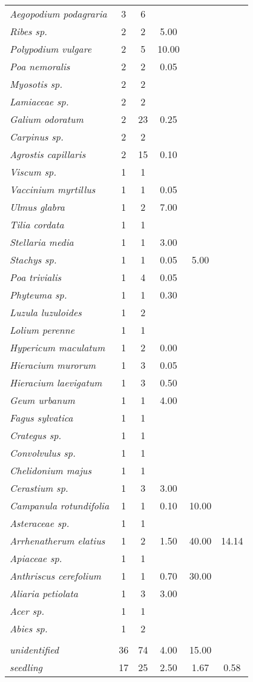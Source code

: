 \documentclass[a4paper]{article}
\newcommand{\dashrule}[1][black]{%
	\color{#1}\rule[\dimexpr.5ex-.2pt]{4pt}{.4pt}\xleaders\hbox{\rule{4pt}{0pt}\rule[\dimexpr.5ex-.2pt]{4pt}{.4pt}}\hfill\kern0pt%
}
\begin{document}
\begin{longtable}[H]{@{} >{\itshape}lccccc @{}}
		 Aegopodium podagraria & 3 & 6 &  &  &  \\ 
		 Ribes sp. & 2 & 2 & 5.00 &  &  \\ 
		 Polypodium vulgare & 2 & 5 & 10.00 &  &  \\ 
		 Poa nemoralis & 2 & 2 & 0.05 &  &  \\ 
		 Myosotis sp. & 2 & 2 &  &  &  \\ 
		 Lamiaceae sp. & 2 & 2 &  &  &  \\ 
		 Galium odoratum & 2 & 23 & 0.25 &  &  \\ 
		 Carpinus sp. & 2 & 2 &  &  &  \\ 
		 Agrostis capillaris & 2 & 15 & 0.10 &  &  \\ 
		 Viscum sp. & 1 & 1 &  &  &  \\ 
		 Vaccinium myrtillus & 1 & 1 & 0.05 &  &  \\ 
		 Ulmus glabra & 1 & 2 & 7.00 &  &  \\ 
		 Tilia cordata & 1 & 1 &  &  &  \\ 
		 Stellaria media & 1 & 1 & 3.00 &  &  \\ 
		 Stachys sp. & 1 & 1 & 0.05 & 5.00 &  \\ 
		 Poa trivialis & 1 & 4 & 0.05 &  &  \\ 
		 Phyteuma sp. & 1 & 1 & 0.30 &  &  \\ 
		 Luzula luzuloides & 1 & 2 &  &  &  \\ 
		 Lolium perenne & 1 & 1 &  &  &  \\ 
		 Hypericum maculatum & 1 & 2 & 0.00 &  &  \\ 
		 Hieracium murorum & 1 & 3 & 0.05 &  &  \\ 
		 Hieracium laevigatum & 1 & 3 & 0.50 &  &  \\ 
		 Geum urbanum & 1 & 1 & 4.00 &  &  \\ 
		 Fagus sylvatica & 1 & 1 &  &  &  \\ 
		 Crategus sp. & 1 & 1 &  &  &  \\ 
		 Convolvulus sp. & 1 & 1 &  &  &  \\ 
		 Chelidonium majus & 1 & 1 &  &  &  \\ 
		 Cerastium sp. & 1 & 3 & 3.00 &  &  \\ 
		 Campanula rotundifolia & 1 & 1 & 0.10 & 10.00 &  \\ 
		 Asteraceae sp. & 1 & 1 &  &  &  \\ 
		 Arrhenatherum elatius & 1 & 2 & 1.50 & 40.00 & 14.14 \\ 
		 Apiaceae sp. & 1 & 1 &  &  &  \\ 
		 Anthriscus cerefolium & 1 & 1 & 0.70 & 30.00 &  \\ 
		 Aliaria petiolata & 1 & 3 & 3.00 &  &  \\ 
		 Acer sp. & 1 & 1 &  &  &  \\ 
		 Abies sp. & 1 & 2 &  &  &  \\ 
		 \multicolumn{6}{@{}c@{}}{\makebox[\linewidth]{\dashrule}} \\[-\jot]
		 unidentified & 36 & 74 & 4.00 & 15.00 &  \\ 
		 seedling & 17 & 25 & 2.50 & 1.67 & 0.58 \\ 
		 

\end{longtable}
\end{document}
